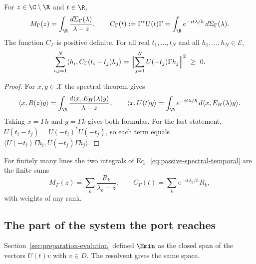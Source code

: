 \begin{proposition}
\label{prop:passive-spectral-temporal}
For $z\in\C\setminus\R$ and $t\in\R$,
\begin{equation}
 M_\Gamma(z)=\int_\R\frac{d\Sigma_\Gamma(\lambda)}{\lambda-z},\qquad
 C_\Gamma(t):=\Gamma^*U(t)\Gamma=\int_\R e^{-it\lambda/\hbar}\,d\Sigma_\Gamma(\lambda).
 \label{eq:passive-spectral-temporal}
\end{equation}
The function $C_\Gamma$ is positive definite. For all real $t_1,\dots,t_N$ and all $h_1,\dots,h_N\in\mathcal E$,
\begin{equation}
 \sum_{i,j=1}^N\langle h_i,C_\Gamma(t_i-t_j)h_j\rangle
   =\Bigl\|\sum_{j=1}^N U(-t_j)\Gamma h_j\Bigr\|^2\ \ge\ 0 .
 \label{eq:passive-time-positive}
\end{equation}
\end{proposition}
\begin{proof}
For $x,y\in\mathcal X$ the spectral theorem gives
\[
 \langle x,R(z)y\rangle=\int_\R\frac{d\langle x,E_H(\lambda)y\rangle}{\lambda-z},\qquad
 \langle x,U(t)y\rangle=\int_\R e^{-it\lambda/\hbar}\,d\langle x,E_H(\lambda)y\rangle .
\]
Taking $x=\Gamma h$ and $y=\Gamma k$ gives both formulas. For the last statement, $U(t_i-t_j)=U(-t_i)^*U(-t_j)$, so each term equals $\langle U(-t_i)\Gamma h_i,U(-t_j)\Gamma h_j\rangle$.
\end{proof}

For finitely many lines the two integrals of Eq.~\eqref{eq:passive-spectral-temporal} are the finite sums
\begin{equation}
 M_\Gamma(z)=\sum_k\frac{R_k}{\lambda_k-z},\qquad C_\Gamma(t)=\sum_ke^{-it\lambda_k/\hbar}R_k ,
 \label{eq:passive-finite-lines}
\end{equation}
with weights of any rank.

\subsection{The part of the system the port reaches}
\label{subsec:passive-minimal}

Section~\ref{sec:preparation-evolution} defined $\Hmin$ as the closed span of the vectors $U(t)v$ with $v\in D$. The resolvent gives the same space.

